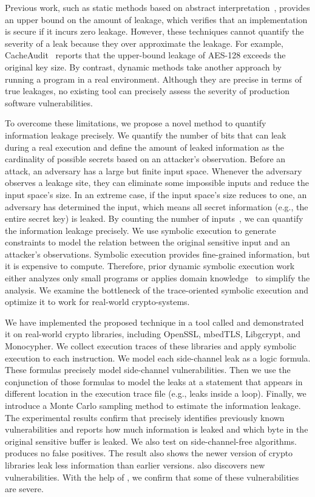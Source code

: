 Previous work, such as static methods based on abstract interpretation~\cite{182946,5207642}, provides an upper bound on the amount of leakage, which verifies that an implementation is secure if it incurs zero leakage.
However, these techniques cannot quantify the severity of a leak because they
over approximate the leakage. For example, CacheAudit~\cite{182946} 
reports that the upper-bound leakage of AES-128 exceeds the original key size. By contrast, dynamic methods take another approach by running a program in a real
environment. Although they are precise in terms of true leakages, no
existing tool can precisely assess the severity of production
software vulnerabilities. 

To overcome these limitations, we propose a novel method to quantify information 
leakage precisely. We quantify the number of bits that can leak during a real 
execution and define the amount of leaked information as the cardinality of 
possible secrets based on an attacker's observation. Before an attack, an adversary has a large but finite input space. 
Whenever the adversary observes a leakage site, they can eliminate some impossible 
inputs and reduce the input space's size. In an extreme case, if the input space's size reduces to one, an adversary has determined the input, which means all secret information (e.g., the entire secret key) is
leaked. By counting the number of inputs~\cite{10.1007/11499107_24}, we can quantify the information leakage precisely.
We use symbolic execution to generate constraints to model the relation 
between the original sensitive input and an attacker's observations. 
Symbolic execution provides fine-grained information, but it is expensive
to compute. Therefore, prior dynamic symbolic
execution work~\cite{203878,236338,Brotzman19Casym} either analyzes only
small programs or applies domain knowledge~\cite{203878} to simplify the analysis. We
examine the bottleneck of the trace-oriented symbolic execution and optimize it
to work for real-world crypto-systems.

We have implemented the proposed technique in a tool called \tool{} and demonstrated 
it on real-world crypto libraries, including OpenSSL, 
mbedTLS, Libgcrypt, and Monocypher.
We collect execution traces of these libraries and apply 
symbolic execution to each instruction. We model
each side-channel leak as a logic formula. These
formulas precisely model side-channel vulnerabilities. 
Then we use the conjunction of those formulas to model the 
leaks at a statement that appears in different location in
the execution trace file (e.g., leaks inside a loop).
Finally, we introduce a Monte Carlo sampling method to estimate 
the information leakage. 
The experimental results confirm
that \tool{} precisely identifies previously known vulnerabilities and 
reports how much information is leaked and which byte in the original sensitive 
buffer is leaked. We also test \tool{} on side-channel-free algorithms. 
\tool{} produces no false positives.
The result also shows the newer version of crypto libraries leak less information 
than earlier versions.
\tool{} also discovers new vulnerabilities. With the help of \tool{}, 
we confirm that some of these vulnerabilities are severe.


